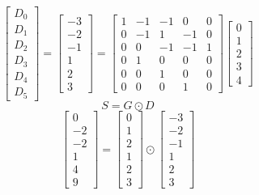 \documentclass{article}%
\begin{document}
\[%
\left[\begin{matrix}D_{0}\\D_{1}\\D_{2}\\D_{3}\\D_{4}\\D_{5}\end{matrix}\right] = \left[\begin{matrix}-3\\-2\\-1\\1\\2\\3\end{matrix}\right] = \left[\begin{matrix}1 & -1 & -1 & 0 & 0\\0 & -1 & 1 & -1 & 0\\0 & 0 & -1 & -1 & 1\\0 & 1 & 0 & 0 & 0\\0 & 0 & 1 & 0 & 0\\0 & 0 & 0 & 1 & 0\end{matrix}\right] \left[\begin{matrix}0\\1\\2\\3\\4\end{matrix}\right]%
\]%
\[%
S = G \odot D%
\]%
\[%
\left[\begin{matrix}0\\-2\\-2\\1\\4\\9\end{matrix}\right] = \left[\begin{matrix}0\\1\\2\\1\\2\\3\end{matrix}\right] \odot \left[\begin{matrix}-3\\-2\\-1\\1\\2\\3\end{matrix}\right]%
\]%
\end{document}
